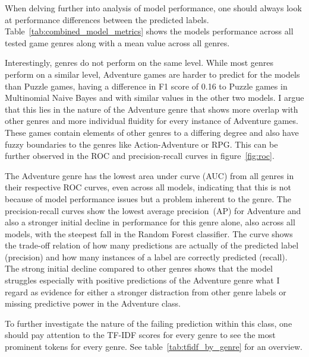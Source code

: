 \documentclass[11pt, a4paper]{article}
\begin{document}


When delving further into analysis of model performance, one should always look at performance differences between
the predicted labels.
Table~\ref{tab:combined_model_metrics} shows the models performance across all tested game genres along with a mean
value across all genres.



Interestingly, genres do not perform on the same level.
While most genres perform on a similar level, Adventure games are harder to predict for the models than Puzzle games,
having a difference in F1 score of 0.16 to Puzzle games in Multinomial Naive Bayes and with similar values in the other two models.
I argue that this lies in the nature of the Adventure genre that shows more overlap with other genres and more
individual fluidity for every instance of Adventure games.
These games contain elements of other genres to a differing degree and also have fuzzy boundaries to the genres like
Action-Adventure or RPG.
This can be further observed in the ROC and precision-recall curves in figure~\ref{fig:roc}.



The Adventure genre has the lowest area under curve (AUC) from all genres in their respective ROC curves, even across
all models, indicating that this is not because of model performance issues but a problem inherent to the genre.
The precision-recall curves show the lowest average precision~(AP) for Adventure and also a stronger initial decline in
performance for this genre alone, also across all models, with the steepest fall in the Random Forest classifier.
The curve shows the trade-off relation of how many predictions are actually of the predicted label (precision) and how
many instances of a label are correctly predicted (recall).
The strong initial decline compared to other genres shows that the model struggles especially with positive predictions
of the Adventure genre what I regard as evidence for either a stronger distraction from other genre labels or missing
predictive power in the Adventure class.

To further investigate the nature of the failing prediction within this class, one should pay attention to the TF-IDF
scores for every genre to see the most prominent tokens for every genre.
See table~\ref{tab:tfidf_by_genre} for an overview.


\end{document}
